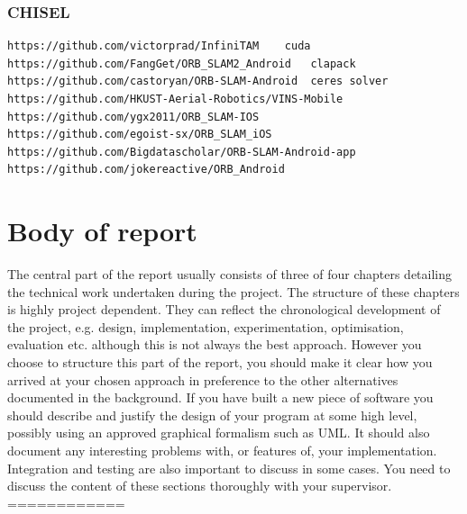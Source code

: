 \documentclass[12pt,twoside]{article}
\begin{document}
\subsubsection{CHISEL}
\begin{verbatim}
https://github.com/victorprad/InfiniTAM    cuda
https://github.com/FangGet/ORB_SLAM2_Android   clapack
https://github.com/castoryan/ORB-SLAM-Android  ceres solver 
https://github.com/HKUST-Aerial-Robotics/VINS-Mobile
https://github.com/ygx2011/ORB_SLAM-IOS
https://github.com/egoist-sx/ORB_SLAM_iOS
https://github.com/Bigdatascholar/ORB-SLAM-Android-app
https://github.com/jokereactive/ORB_Android
\end{verbatim}


\newpage

\section{Body of report}
The central part of the report usually consists of three of four chapters detailing the technical work undertaken during the project. The structure of these chapters is highly project dependent. They can reflect the chronological development of the project, e.g. design, implementation, experimentation, optimisation, evaluation etc. although this is not always the best approach. However you choose to structure this part of the report, you should make it clear how you arrived at your chosen approach in preference to the other alternatives documented in the background. If you have built a new piece of software you should describe and justify the design of your program at some high level, possibly using an approved graphical formalism such as UML. It should also document any interesting problems with, or features of, your implementation. Integration and testing are also important to discuss in some cases. You need to discuss the content of these sections thoroughly with your supervisor.\\

============\\
\end{document}
